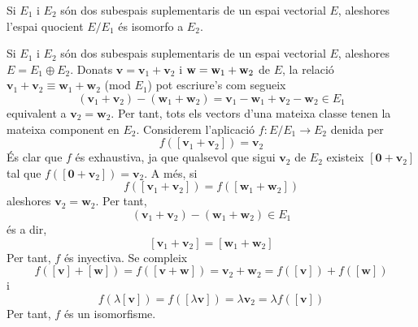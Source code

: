 \begin{teorema}
Si $E_{1}$ i $E_{2}$ són dos subespais suplementaris de
un espai vectorial $E$, aleshores l’espai quocient $E/%
E_{1}$ és isomorfo a $E_{2}$.

\end{teorema}
\begin{prova}
Si $E_{1}$ i $E_{2}$ són dos subespais suplementaris de
un espai vectorial $E$, aleshores $E=E_{1}\oplus 
E_{2}$. Donats $\mathbf{v}=\mathbf{v}_{1}+\mathbf{v}_{2}$ i $\mathbf{%
w}=\mathbf{w}_{1}+\mathbf{w}_{2}$ de $E$, la relació $\mathbf{v%
}_{1}+\mathbf{v}_{2}\equiv \mathbf{w}_{1}+\mathbf{w}_{2}$ (mod $E%
_{1}$) pot escriure’s com segueix%
\begin{equation*}
(\mathbf{v}_{1}+\mathbf{v}_{2})-(\mathbf{w}_{1}+\mathbf{w}_{2})=\mathbf{v}%
_{1}-\mathbf{w}_{1}+\mathbf{v}_{2}-\mathbf{w}_{2}\in E_{1}
\end{equation*}%
equivalent a $\mathbf{v}_{2}=\mathbf{w}_{2}$. Per tant, tots els vectors
d’una mateixa classe tenen la mateixa component en $E_{2}$.
Considerem l’aplicació $f:E/E_{1}\rightarrow 
E_{2}$ denida per%
\begin{equation*}
f(\left[ \mathbf{v}_{1}+\mathbf{v}_{2}\right] )=\mathbf{v}_{2}
\end{equation*}%
És clar que $f$ és exhaustiva, ja que qualsevol que sigui $\mathbf{v}_{2}$ de $%
E_{2}$ existeix $\left[ \mathbf{0}+\mathbf{v}_{2}\right] $ tal que $%
f\left( \left[ \mathbf{0}+\mathbf{v}_{2}\right] \right) =\mathbf{v}_{2}$.
A més, si 
\begin{equation*}
f\left( \left[ \mathbf{v}_{1}+\mathbf{v}_{2}\right] \right) =f\left( \left[ 
\mathbf{w}_{1}+\mathbf{w}_{2}\right] \right)
\end{equation*}%
aleshores $\mathbf{v}_{2}=\mathbf{w}_{2}$. Per tant,%
\begin{equation*}
(\mathbf{v}_{1}+\mathbf{v}_{2})-(\mathbf{w}_{1}+\mathbf{w}_{2})\in E%
_{1}
\end{equation*}%
és a dir,%
\begin{equation*}
\left[ \mathbf{v}_{1}+\mathbf{v}_{2}\right] =\left[ \mathbf{w}_{1}+\mathbf{w}%
_{2}\right]
\end{equation*}
Per tant, $f$ és inyectiva. Se compleix%
\begin{equation*}
f\left( \left[ \mathbf{v}\right] +\left[ \mathbf{w}\right] \right) =f\left( %
\left[ \mathbf{v}+\mathbf{w}\right] \right) =\mathbf{v}_{2}+\mathbf{w}%
_{2}=f\left( \left[ \mathbf{v}\right] \right) +f\left( \left[ \mathbf{w}%
\right] \right)
\end{equation*}%
i%
\begin{equation*}
f\left( \lambda \left[ \mathbf{v}\right] \right) =f\left( \left[ \lambda 
\mathbf{v}\right] \right) =\lambda \mathbf{v}_{2}=\lambda f\left( \left[ 
\mathbf{v}\right] \right)
\end{equation*}%
Per tant, $f$ és un isomorfisme.
\end{prova}


